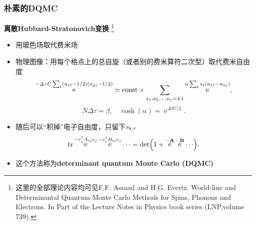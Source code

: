 \documentclass[UTF8]{ctexbeamer}
\DeclareMathOperator{\ee}{e}
\newcommand{\concept}[1]{\textbf{#1}}
\begin{document}
\begin{frame}
\frametitle{朴素的DQMC}

\concept{离散Hubbard-Stratonovich变换}%
\footnote{
    这里的全部理论内容均可见F.F. Assaad and H.G. Evertz. World-line and Determinantal Quantum Monte Carlo Methods for Spins, Phonons and Electrons. In Part of the Lecture Notes in Physics book series (LNP,volume 739).
}%
\begin{itemize}
    \item 用玻色场取代费米场
    \item 物理图像：用每个格点上的总自旋（或者别的费米算符二次型）取代费米自由度
    \begin{equation}
        \ee^{-\Delta \tau U \sum_{\vb*{i}} (n_{\vb*{i} \uparrow} - 1/2) (n_{\vb*{j} \downarrow} - 1/2)} \simeq \text{const} \times \sum_{s_1, s_2, \ldots, s_n = \pm 1} \ee^{\alpha \sum_{\vb*{i}} s_{\vb*{i}} ({n}_{\vb*{i} \uparrow} - {n}_{\vb*{i} \downarrow})},
    \end{equation}
    \begin{equation}
        N \Delta \tau = \beta, \quad \cosh(\alpha) = \ee^{\Delta \tau U / 2}.
    \end{equation}
    \item 随后可以“积掉”电子自由度，只留下$s_{\vb*{i}, \tau}$
    \begin{equation}
        \trace \ee^{- c^\dagger_i A_{ij} c_j} \ee^{- c^\dagger_i B_{ij} c_j} \cdots = \det(1 + \ee^{- \vb{A}} \ee^{- \vb{B}} \cdots).
    \end{equation}
    \item 这个方法称为\concept{determinant quantum Monte Carlo (DQMC)}
\end{itemize}

\end{frame}
\end{document}
